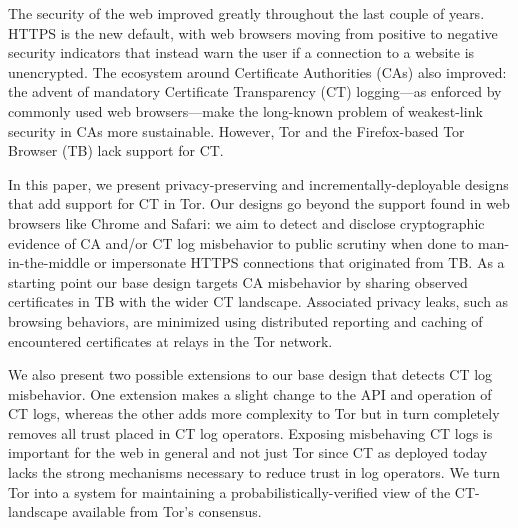 The security of the web improved greatly throughout the last couple of years.
HTTPS is the new default, with web browsers moving from positive to
negative security indicators that instead warn the user if a connection to a
website is unencrypted.  The ecosystem around Certificate Authorities (CAs) also
improved:
	the advent of mandatory Certificate Transparency (CT) logging---as
	enforced by commonly used web browsers---make the long-known problem of
	weakest-link security in CAs more sustainable.
However, Tor and the Firefox-based Tor Browser (TB) lack support for CT.

\hspace{12pt}
In this paper, we present privacy-preserving and incrementally-deployable
designs that add support for CT in Tor. Our designs go beyond the
support found in web browsers like Chrome and Safari:
	we aim to detect and disclose cryptographic evidence of CA and/or
	CT log misbehavior to public scrutiny when done to man-in-the-middle or
	impersonate HTTPS connections that originated from TB\@.
As a starting point our base design targets CA misbehavior by sharing observed
certificates in TB with the wider CT landscape.  Associated privacy
leaks, such as browsing behaviors, are minimized using distributed reporting and
caching of encountered certificates at relays in the Tor network.


\hspace{12pt}
We also present two possible extensions to our base design that detects CT log
misbehavior. One extension makes a slight change to the API and operation
of CT logs, whereas the other adds more complexity to Tor but in turn completely
removes all trust placed in CT log operators.  Exposing misbehaving CT logs
is important for the web in general and not just Tor since CT as deployed today
lacks the strong mechanisms necessary to reduce trust in log operators.  We turn
Tor into a system for maintaining a probabilistically-verified view of the 
CT-landscape available from Tor’s consensus.
